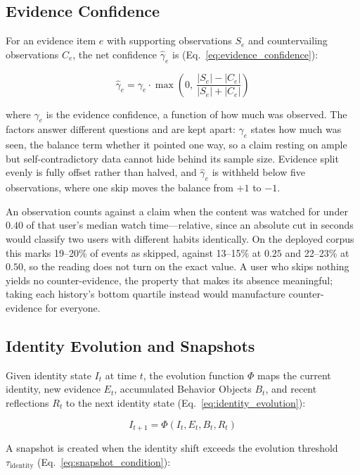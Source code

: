 \documentclass[conference]{IEEEtran}
\begin{document}
\subsection{Evidence Confidence}
For an evidence item $e$ with supporting observations $S_e$ and countervailing observations $C_e$, the net confidence $\hat{\gamma}_e$ is (Eq.~\eqref{eq:evidence_confidence}):

\begin{equation}
\hat{\gamma}_e = \gamma_e \cdot \max\left(0,\ \frac{|S_e| - |C_e|}{|S_e| + |C_e|}\right)
\label{eq:evidence_confidence}
\end{equation}

where $\gamma_e$ is the evidence confidence, a function of how much was observed. The factors answer different questions and are kept apart: $\gamma_e$ states how much was seen, the balance term whether it pointed one way, so a claim resting on ample but self-contradictory data cannot hide behind its sample size. Evidence split evenly is fully offset rather than halved, and $\hat{\gamma}_e$ is withheld below five observations, where one skip moves the balance from $+1$ to $-1$.

An observation counts against a claim when the content was watched for under $0.40$ of that user's median watch time---relative, since an absolute cut in seconds would classify two users with different habits identically. On the deployed corpus this marks 19--20\% of events as skipped, against 13--15\% at $0.25$ and 22--23\% at $0.50$, so the reading does not turn on the exact value. A user who skips nothing yields no counter-evidence, the property that makes its absence meaningful; taking each history's bottom quartile instead would manufacture counter-evidence for everyone.

\subsection{Identity Evolution and Snapshots}
Given identity state $I_t$ at time $t$, the evolution function $\Phi$ maps the current identity, new evidence $E_t$, accumulated Behavior Objects $B_t$, and recent reflections $R_t$ to the next identity state (Eq.~\eqref{eq:identity_evolution}):

\begin{equation}
I_{t+1} = \Phi(I_t, E_t, B_t, R_t)
\label{eq:identity_evolution}
\end{equation}

A snapshot is created when the identity shift exceeds the evolution threshold $\tau_{\text{identity}}$ (Eq.~\eqref{eq:snapshot_condition}):
\end{document}
